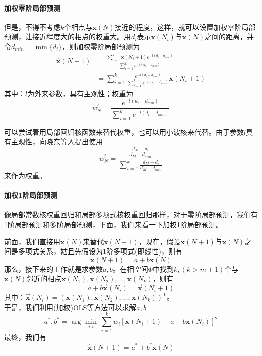             \paragraph{加权零阶局部预测}
            但是，不得不考虑$k$个相点与$\mathbf{x}(N)$接近的程度，这样，就可以设置加权零阶局部预测，让接近程度大的相点的权重大。用$d_i$表示$\mathbf{x}(N_i)$与$\mathbf{x}(N)$之间的距离，并令$d_{min} = \min \{d_i\}$，则加权零阶局部预测为
            \begin{align*}
                \hat{\mathbf{x}} (N+1) &=\frac{\sum_{i = 1}^k \mathbf{x}(N_i+1) e^{-l(d_i - d_{min})}}{\sum_{i = 1}^k e^{-l(d_i - d_{min})}}\\
                & =\sum_{i = 1}^k \frac{e^{-l(d_i - d_{min})}}{\sum_{i = 1}^k e^{-l(d_i - d_{min})}} \mathbf{x}(N_i+1)
            \end{align*}
            其中：$l$为外来参数，具有主观性；权重为
            \[
                w_N^i = \frac{e^{-l(d_i - d_{min})}}{\sum_{i = 1}^k e^{-l(d_i - d_{min})}}
            \]
            \par
            可以尝试着用局部回归核函数来替代权重，也可以用小波核来代替。由于参数$l$具有主观性，向晓东等人提出使用
            \[
                w_N^i = \frac{\frac{d_M - d_i}{d_M - d_{min}}}{\sum_{i = 1}^k \frac{d_M - d_i}{d_M - d_{min}}}
            \]
            来作为权重。
            \paragraph{加权1阶局部预测}
            像局部常数核权重回归和局部多项式核权重回归那样，对于零阶局部预测，我们有1阶局部预测和多阶局部预测，下面，我们来看一下加权1阶局部预测。
            \par
            前面，我们直接用$\mathbf{x}(N)$来替代$\mathbf{x}(N+1)$，现在，假设$\mathbf{x}(N+1)$与$\mathbf{x}(N)$之间是多项式关系，姑且先假设为1阶多项式(即线性)，则有
            \[
                \mathbf{x}(N+1) = a+b\mathbf{x}(N)
            \]
            那么，接下来的工作就是求参数$a,b$。在相空间$\Phi$中找到$k,(k>m+1)$个与$\mathbf{x}(N)$邻近的相点$\mathbf{x}(N_1),\mathbf{x}(N_2),\dots,\mathbf{x}(N_k)$，则有
            \[
                a + b\vec{\mathbf{x}}(N_i) = \vec{\mathbf{x}}(N_i+1)
            \]
            其中：$\vec{\mathbf{x}}(N_i) = (\mathbf{x}(N_1),\mathbf{x}(N_2),\dots,\mathbf{x}(N_k)) ^{\mathrm{T}}$。\\
            于是，我们利用(加权)OLS等方法可以求解$a,b$
            \[
                a^*,b^* = \arg \min_{a,b} \ \sum_{i = 1}^k w_i [\mathbf{x}(N_i+1) - a - b\mathbf{x}(N_i)]^2
            \]
            最终，我们有
            \[
                \hat{\mathbf{x}}(N+1) = a^* + b^* \mathbf{x}(N)
            \]
